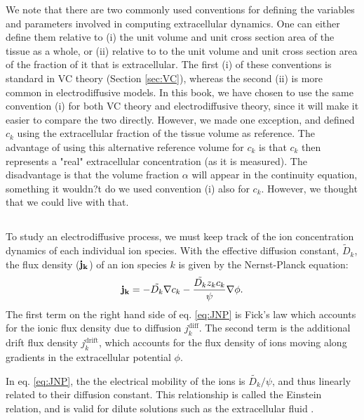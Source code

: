 We note that there are two commonly used conventions for defining the variables and parameters involved in computing extracellular dynamics. One can either define them relative to (i) the unit volume and unit cross section area of the tissue as a whole, or (ii) relative to to the unit volume and unit cross section area of the fraction of it that is extracellular. The first (i) of these conventions is standard in VC theory (Section \ref{sec:VC}), whereas the second (ii) is more common in electrodiffusive models. In this book, we have chosen to use the same convention (i) for both VC theory and electrodiffusive theory, since it will make it easier to compare the two directly. However, we made one exception, and defined $c_k$ using the extracellular fraction of the tissue volume as reference. The advantage of using this alternative reference volume for $c_k$ is that $c_k$ then represents a "real" extracellular concentration (as it is measured). The disadvantage is that the volume fraction $\alpha$ will appear in the continuity equation, something it wouldn?t do we used convention (i) also for $c_k$. However, we thought that we could live with that.


\subsection{}
To study an electrodiffusive process, we must keep track of the ion concentration dynamics of each individual ion species. 
With the effective diffusion constant, $\tilde{D}_k$, the flux density (${\bf j_k}$) of an ion species $k$ is given by the Nernst-Planck equation:
\begin{equation}
{\bf j_k} = - \tilde{D_k} {\bf \nabla} c_{k} - \frac{\tilde{D_k} z_k c_k}{\psi} {\bf \nabla} \phi.
\label{eq:JNP}
\end{equation}
The first term on the right hand side of eq. \ref{eq:JNP} is Fick's law which accounts for the ionic flux density due to diffusion $j_{k}^\text{diff}$. The second term is the additional drift flux density $j_{k}^\text{drift}$, which accounts for the flux density of ions moving along gradients in the extracellular potential $\phi$.

In eq. \ref{eq:JNP}, the the electrical mobility of the ions is $\tilde{D_k}/\psi$, and thus linearly related to their diffusion constant. This relationship is called the Einstein relation, and is valid for dilute solutions such as the extracellular fluid \cite{Grodzinsky2011} . 

